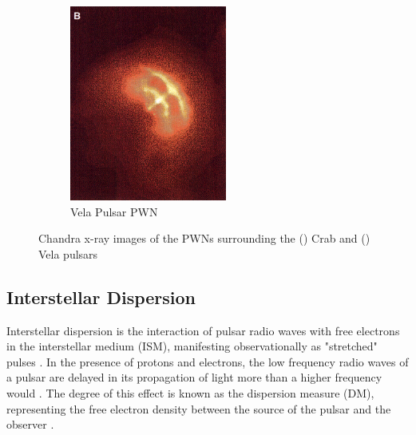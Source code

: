 \documentclass[12pt]{article}
\begin{document}
\begin{figure}[H]
\begin{subfigure}[b]{.485\textwidth}
        \includegraphics[width=\linewidth]{vera pwn.png}
        \caption{Vela Pulsar PWN}
        \label{fig:2b}
    \end{subfigure}
    \caption{Chandra x-ray images of the PWNs surrounding the () Crab and () Vela pulsars \protect\cite{pulsars}}
    \label{fig:2}
\end{figure}

\subsection{Interstellar Dispersion} \label{sec:1.4}

Interstellar dispersion is the interaction of pulsar radio waves with free electrons in the interstellar medium (ISM), manifesting observationally as "stretched" pulses \cite{interstellardispersion,keith2013measurement,interstellardispersion2}. In the presence of protons and electrons, the low frequency radio waves of a pulsar are delayed in its propagation of light more than a higher frequency would \cite{interstellardispersion}.
The degree of this effect is known as the dispersion measure (DM), representing the free electron density between the source of the pulsar and the observer \cite{interstellardispersion,keith2013measurement}.
\end{document}

